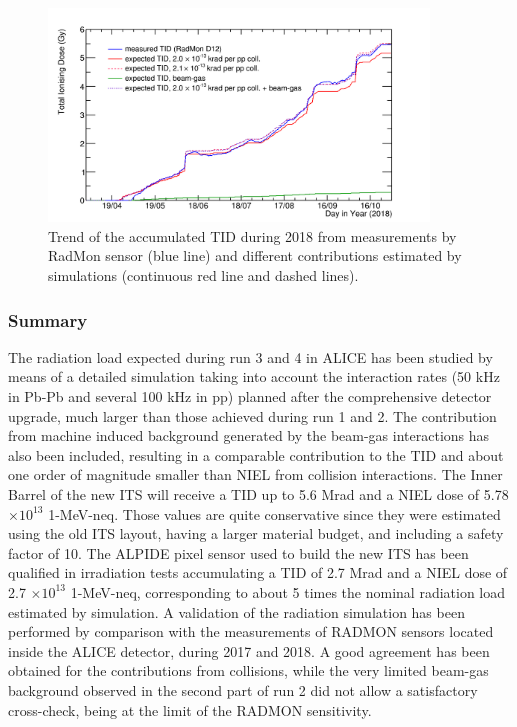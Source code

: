 \begin{figure}[!t]
\begin{center}
\includegraphics[width=0.9\textwidth]{figures/SensorSimulation/radmon2018.png}	
\end{center}
\caption{Trend of the accumulated TID during 2018 from measurements by RadMon sensor (blue line) and different contributions estimated by simulations (continuous red line and dashed lines).}
\label{radmon2} 
\end{figure}

\subsubsection{Summary}
The radiation load expected during {\sc run} 3 and 4 in ALICE has been studied by means of a detailed simulation taking into account the interaction rates (50 kHz in Pb-Pb and several 100 kHz in pp) planned after the comprehensive detector upgrade, much larger than those achieved during {\sc run} 1 and 2. The contribution from machine induced background generated by the beam-gas interactions has also been included, resulting in a comparable contribution to the TID and about one order of magnitude smaller than NIEL from collision interactions. The Inner Barrel of the new ITS will receive a TID up to 5.6 Mrad and a NIEL dose of 5.78 $\times 10^{13}$ 1-MeV-neq. Those values are quite conservative since they were estimated using the old ITS layout, having a larger material budget, and including a safety factor of 10. The ALPIDE pixel sensor used to build the new ITS has been qualified in irradiation tests accumulating a TID of 2.7 Mrad and a NIEL dose of 2.7 $\times 10^{13}$ 1-MeV-neq, corresponding to about 5 times the nominal radiation load estimated by simulation. A validation of the radiation simulation has been performed by comparison with the measurements of RADMON sensors located inside the ALICE detector, during 2017 and 2018. A good agreement has been obtained for the contributions from collisions, while the very limited beam-gas background observed in the second part of {\sc run} 2 did not allow a satisfactory cross-check, being at the limit of the RADMON sensitivity. 




